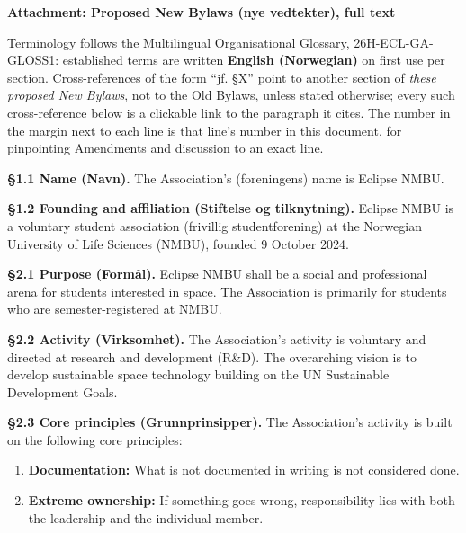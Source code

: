 \documentclass{../../../Common/Latex/Templates/rapport}
\begin{document}
\newpage
\begin{center}
  {\Large\bfseries Attachment: Proposed New Bylaws (nye vedtekter), full text}\par
\end{center}
\tableofcontents

Terminology follows the Multilingual Organisational Glossary, 26H-ECL-GA-GLOSS1: established terms are written \textbf{English (Norwegian)} on first use per section. Cross-references of the form ``jf. \S X'' point to another section of \emph{these proposed New Bylaws}, not to the Old Bylaws, unless stated otherwise; every such cross-reference below is a clickable link to the paragraph it cites. The number in the margin next to each line is that line's number in this document, for pinpointing Amendments and discussion to an exact line.

\linenumbers


\label{bylaw:1}
\textbf{\S 1.1 Name (Navn).}\label{bylaw:1.1} The Association's (foreningens) name is Eclipse NMBU.

\textbf{\S 1.2 Founding and affiliation (Stiftelse og tilknytning).}\label{bylaw:1.2} Eclipse NMBU is a voluntary student association (frivillig studentforening) at the Norwegian University of Life Sciences (NMBU), founded 9 October 2024.

\label{bylaw:2}
\textbf{\S 2.1 Purpose (Formål).}\label{bylaw:2.1} Eclipse NMBU shall be a social and professional arena for students interested in space. The Association is primarily for students who are semester-registered at NMBU.

\textbf{\S 2.2 Activity (Virksomhet).}\label{bylaw:2.2} The Association's activity is voluntary and directed at research and development (R\&D). The overarching vision is to develop sustainable space technology building on the UN Sustainable Development Goals.

\textbf{\S 2.3 Core principles (Grunnprinsipper).}\label{bylaw:2.3} The Association's activity is built on the following core principles:
\begin{enumerate}
  \item \textbf{Documentation:} What is not documented in writing is not considered done.
  \item \textbf{Extreme ownership:} If something goes wrong, responsibility lies with both the leadership and the individual member.
\end{enumerate}
\end{document}
